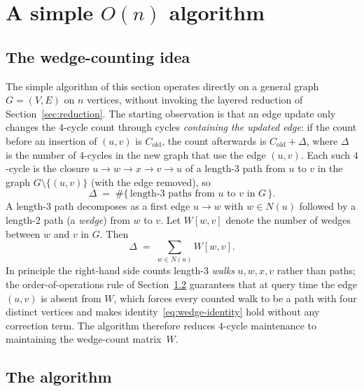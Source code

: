 \documentclass[sigconf,nonacm]{acmart}
\theoremstyle{plain}
\theoremstyle{definition}
\begin{document}
\section{A simple $O(n)$ algorithm}
\label{sec:simple}

\subsection{The wedge-counting idea}
\label{sec:simple:idea}
The simple algorithm of this section operates directly on a general
graph $G = (V, E)$ on $n$ vertices, without invoking the layered
reduction of Section~\ref{sec:reduction}. The starting observation is
that an edge update only changes the $4$-cycle count through cycles
\emph{containing the updated edge}: if the count before an
insertion of $(u, v)$ is $C_{\text{old}}$, the count afterwards is
$C_{\text{old}} + \Delta$, where $\Delta$ is the number of $4$-cycles
in the new graph that use the edge $(u, v)$. Each such $4$-cycle is
the closure $u \to w \to x \to v \to u$ of a length-$3$ path from
$u$ to $v$ in the graph $G \setminus \{(u, v)\}$ (with the edge
removed), so
\[
  \Delta \;=\; \#\{\,\text{length-$3$ paths from $u$ to $v$ in } G\,\}.
\]
A length-$3$ path decomposes as a first edge $u \to w$ with
$w \in N(u)$ followed by a length-$2$ path (a \emph{wedge}) from $w$
to $v$. Let $W[w, v]$ denote the number of wedges between $w$ and $v$
in $G$. Then
\begin{equation}
  \label{eq:wedge-identity}
  \Delta \;=\; \sum_{w \in N(u)} W[w, v].
\end{equation}
In principle the right-hand side counts length-$3$ \emph{walks}
$u, w, x, v$ rather than paths; the order-of-operations rule of
Section~\ref{sec:simple:algorithm} guarantees that at query time
the edge $(u, v)$ is absent from $W$, which forces every counted
walk to be a path with four distinct vertices and makes
identity~\eqref{eq:wedge-identity} hold without any correction term.
The algorithm therefore reduces $4$-cycle maintenance to maintaining
the wedge-count matrix~$W$.

\subsection{The algorithm}
\label{sec:simple:algorithm}
\end{document}
